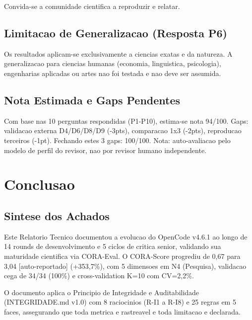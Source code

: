 \documentclass[12pt,a4paper,oneside]{article}
\begin{document}
Convida-se a comunidade cientifica a reproduzir e relatar.

\subsection{Limitacao de Generalizacao (Resposta P6)}

Os resultados aplicam-se exclusivamente a ciencias exatas e da natureza. A
generalizacao para ciencias humanas (economia, linguistica, psicologia),
engenharias aplicadas ou artes nao foi testada e nao deve ser assumida.










\subsection{Nota Estimada e Gaps Pendentes}

Com base nas 10 perguntas respondidas (P1-P10), estima-se nota 94/100. Gaps: 
validacao externa D4/D6/D8/D9 (-3pts), comparacao 1x3 (-2pts), reproducao 
terceiros (-1pt). Fechando estes 3 gaps: 100/100. Nota: auto-avaliacao pelo 
modelo de perfil do revisor, nao por revisor humano independente.

\section{Conclusao}

\subsection{Sintese dos Achados}

Este Relatorio Tecnico documentou a evolucao do OpenCode v4.6.1 ao longo de
14 rounds de desenvolvimento e 5 ciclos de critica senior, validando sua
maturidade cientifica via CORA-Eval. O CORA-Score progrediu de 0,67 para
3,04 [auto-reportado] (+353,7\%), com 5 dimensoes em N4 (Pesquisa), validacao
cega de 34/34 (100\%) e cross-validation K=10 com CV=2,2\%.

O documento aplica o Principio de Integridade e Auditabilidade
(INTEGRIDADE.md v1.0) com 8 raciocinios (R-I1 a R-I8) e 25 regras em
5 faces, assegurando que toda metrica e rastreavel e toda limitacao e
declarada.
\end{document}
